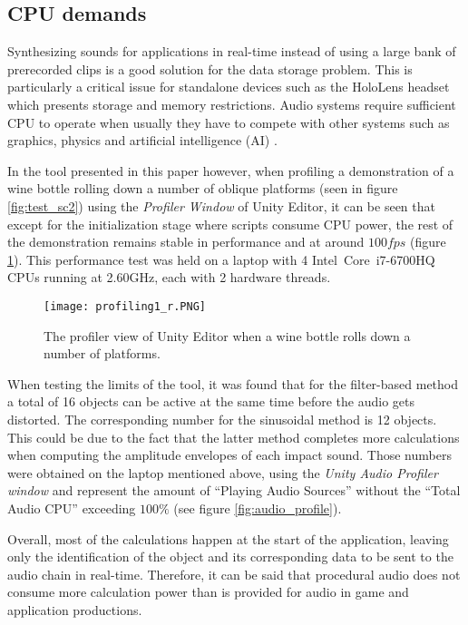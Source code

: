 \subsection{CPU demands}\label{subsec: cpu}
Synthesizing sounds for applications in real-time instead of using a large bank of prerecorded clips is a good solution for the data storage problem. This is particularly a critical issue for standalone devices such as the HoloLens headset which presents storage and memory restrictions. Audio systems require sufficient CPU to operate when usually they have to compete with other systems such as graphics, physics and artificial intelligence (AI) \cite{lloyd2011sound}. 

In the tool presented in this paper however, when profiling a demonstration of a wine bottle rolling down a number of oblique platforms (seen in figure \ref{fig:test_sc2}) using the \textit{Profiler Window} of Unity\textsuperscript{\textregistered} Editor, it can be seen that except for the initialization stage where scripts consume CPU power, the rest of the demonstration remains stable in performance and at around $100 fps$ (figure \ref{fig:profile}). This performance test was held on a laptop with 4 Intel\textregistered\ Core\texttrademark\ i7-6700HQ CPUs running at 2.60GHz, each with 2 hardware threads.

\begin{figure}[H]
  \centering
    \texttt{[image: profiling1\_r.PNG]}
      \caption{The profiler view of Unity\textsuperscript{\textregistered} Editor when a wine bottle rolls down a number of platforms.}
      \label{fig:profile}
\end{figure} 

When testing the limits of the tool, it was found that for the filter-based method a total of 16 objects can be active at the same time before the audio gets distorted. The corresponding number for the sinusoidal method is 12 objects. This could be due to the fact that the latter method completes more calculations when computing the amplitude envelopes of each impact sound. Those numbers were obtained on the laptop mentioned above, using the \textit{Unity\textsuperscript{\textregistered} Audio Profiler window} and represent the amount of ``Playing Audio Sources'' without the ``Total Audio CPU'' exceeding $100\%$ (see figure \ref{fig:audio_profile}).

Overall, most of the calculations happen at the start of the application, leaving only the identification of the object and its corresponding data to be sent to the audio chain in real-time.  Therefore, it can be said that procedural audio does not consume more calculation power than is provided for audio in game and application productions.   

